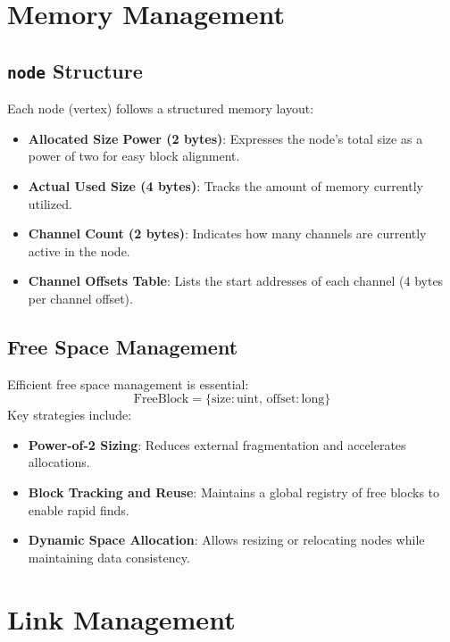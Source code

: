 \documentclass[12pt, a4paper]{article}
\begin{document}
\section{Memory Management}\label{Sec:Memory}
\subsection{\texttt{node} Structure}
Each node (vertex) follows a structured memory layout:
\begin{itemize}
    \item \textbf{Allocated Size Power (2 bytes)}: Expresses the node’s total size as a power of two for easy block alignment.
    \item \textbf{Actual Used Size (4 bytes)}: Tracks the amount of memory currently utilized.
    \item \textbf{Channel Count (2 bytes)}: Indicates how many channels are currently active in the node.
    \item \textbf{Channel Offsets Table}: Lists the start addresses of each channel (4 bytes per channel offset).
\end{itemize}

\subsection{Free Space Management}
Efficient free space management is essential:
\begin{equation}
    \mathrm{FreeBlock} = \{ \mathrm{size}: \mathrm{uint},\, \mathrm{offset}: \mathrm{long} \}
\end{equation}
Key strategies include:
\begin{itemize}
    \item \textbf{Power-of-2 Sizing}: Reduces external fragmentation and accelerates allocations.
    \item \textbf{Block Tracking and Reuse}: Maintains a global registry of free blocks to enable rapid finds.
    \item \textbf{Dynamic Space Allocation}: Allows resizing or relocating nodes while maintaining data consistency.
\end{itemize}

\section{Link Management}\label{Sec:Links}
\end{document}
